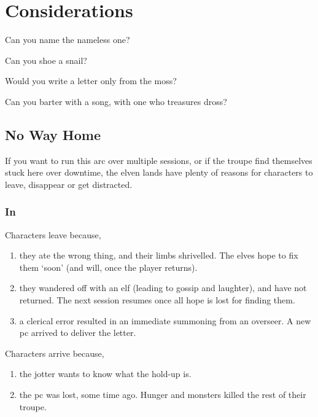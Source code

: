 \section{Considerations}

\begin{exampletext}
  Can you name the nameless one?

  Can you shoe a snail?

  Would you write a letter only from the moss?

  Can you barter with a song, with one who treasures dross?
\end{exampletext}

\begin{multicols}{2}

\subsection{No Way Home}

If you want to run this arc over multiple sessions, or if the troupe find themselves stuck here over \gls{downtime}, the elven lands have plenty of reasons for characters to leave, disappear or get distracted.

\subsubsection{In }

Characters leave because,

\begin{enumerate}
  \item
  they ate the wrong thing, and their limbs shrivelled.
  The elves hope to fix them `soon' (and will, once the player returns).
  \item
  they wandered off with an elf (leading to gossip and laughter), and have not returned.
  The next session resumes once all hope is lost for finding them.
  \item
  a clerical error resulted in an immediate summoning from an overseer.
  A new \gls{pc} arrived to deliver the letter.
\end{enumerate}

Characters arrive because,

\begin{enumerate}
  \item
  the \gls{jotter} wants to know what the hold-up is.
  \item
  the \gls{pc} was lost, some time ago.
  Hunger and monsters killed the rest of their troupe.
\end{enumerate}


\end{multicols}
